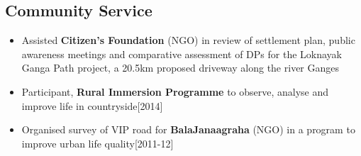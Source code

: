 \documentclass{article}
\begin{document}
\subsection*{\large Community Service}
\vspace{-4pt}
\begin{itemize}[itemsep = -2pt, leftmargin=*]
	\item Assisted \textbf{Citizen's Foundation} (NGO) in review of settlement plan, public awareness meetings and comparative assessment of DPs for the Loknayak Ganga Path project, a 20.5km proposed driveway along the river Ganges
	\item Participant, \textbf{Rural Immersion Programme} to observe, analyse and improve life in countryside\hfill{[2014]}
	\item Organised survey of VIP road for \textbf{BalaJanaagraha} (NGO) in a program to improve urban life quality\hfill{[2011-12]}
\end{itemize}
\vspace{-20pt}
\end{document}
